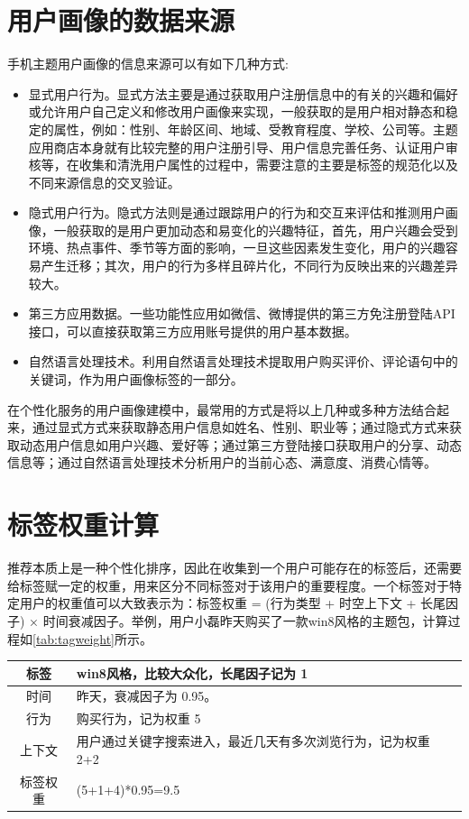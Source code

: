    \section{用户画像的数据来源}
    手机主题用户画像的信息来源可以有如下几种方式:
    \begin{itemize}
    \item 显式用户行为。显式方法主要是通过获取用户注册信息中的有关的兴趣和偏好或允许用户自己定义和修改用户画像来实现，一般获取的是用户相对静态和稳定的属性，例如：性别、年龄区间、地域、受教育程度、学校、公司等。主题应用商店本身就有比较完整的用户注册引导、用户信息完善任务、认证用户审核等，在收集和清洗用户属性的过程中，需要注意的主要是标签的规范化以及不同来源信息的交叉验证。
    \item 隐式用户行为。隐式方法则是通过跟踪用户的行为和交互来评估和推测用户画像，一般获取的是用户更加动态和易变化的兴趣特征，首先，用户兴趣会受到环境、热点事件、季节等方面的影响，一旦这些因素发生变化，用户的兴趣容易产生迁移；其次，用户的行为多样且碎片化，不同行为反映出来的兴趣差异较大。
    \item 第三方应用数据。一些功能性应用如微信、微博提供的第三方免注册登陆API接口，可以直接获取第三方应用账号提供的用户基本数据。
    \item 自然语言处理技术。利用自然语言处理技术提取用户购买评价、评论语句中的关键词，作为用户画像标签的一部分。
    \end{itemize}

    在个性化服务的用户画像建模中，最常用的方式是将以上几种或多种方法结合起来，通过显式方式来获取静态用户信息如姓名、性别、职业等；通过隐式方式来获取动态用户信息如用户兴趣、爱好等；通过第三方登陆接口获取用户的分享、动态信息等；通过自然语言处理技术分析用户的当前心态、满意度、消费心情等。

    \section{标签权重计算}
    推荐本质上是一种个性化排序，因此在收集到一个用户可能存在的标签后，还需要给标签赋一定的权重，用来区分不同标签对于该用户的重要程度。一个标签对于特定用户的权重值可以大致表示为：标签权重 = (行为类型 + 时空上下文 + 长尾因子) × 时间衰减因子。举例，用户小磊昨天购买了一款win8风格的主题包，计算过程如\autoref{tab:tagweight}所示。
    \begin{table}[htp]
    \centering
    \label{tab:tagweight}
    \begin{tabular}{|c|p{8cm}|} \hline
     标签 & win8风格，比较大众化，长尾因子记为 1 \\ \hline
     时间 & 昨天，衰减因子为 0.95。 \\ \hline
     行为 & 购买行为，记为权重 5 \\ \hline
     上下文 & 用户通过关键字搜索进入，最近几天有多次浏览行为，记为权重 2+2 \\ \hline
     标签权重 &  (5+1+4)*0.95=9.5 \\ \hline
    \end{tabular}
    \end{table}

